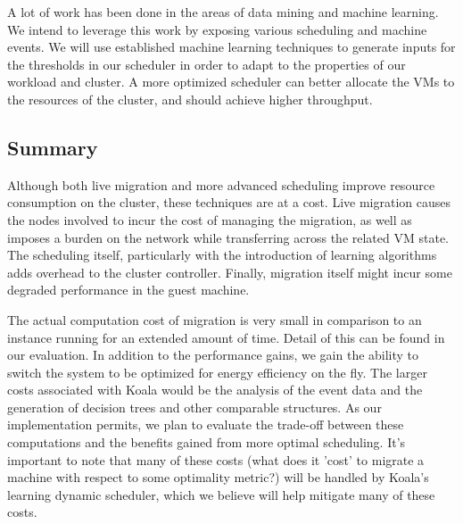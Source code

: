 A lot of work has been done in the areas of data mining and machine learning.  We intend to leverage this work by exposing various scheduling and machine events.  We will use established machine learning techniques to generate inputs for the thresholds in our scheduler in order to adapt to the properties of our workload and cluster.  A more optimized scheduler can better allocate the VMs to the resources of the cluster, and should achieve higher throughput.

\subsection{Summary}

Although both live migration and more advanced scheduling improve resource consumption on the cluster, these techniques are at a cost.  Live migration causes the nodes involved to incur the cost of managing the migration, as well as imposes a burden on the network while transferring across the related VM state.  The scheduling itself, particularly with the introduction of learning algorithms adds overhead to the cluster controller.  Finally, migration itself might incur some degraded performance in the guest machine.

The actual computation cost of migration is very small in comparison to an instance running for an extended amount of time.  Detail of this can be found in our evaluation.  In addition to the performance gains, we gain the ability to switch the system to be optimized for energy efficiency on the fly.  The larger costs associated with Koala would be the analysis of the event data and the generation of decision trees and other comparable structures.  As our implementation permits, we plan to evaluate the trade-off between these computations and the benefits gained from more optimal scheduling.  It's important to note that many of these costs (what does it 'cost' to migrate a machine with respect to some optimality metric?) will be handled by Koala's learning dynamic scheduler, which we believe will help mitigate many of these costs.
